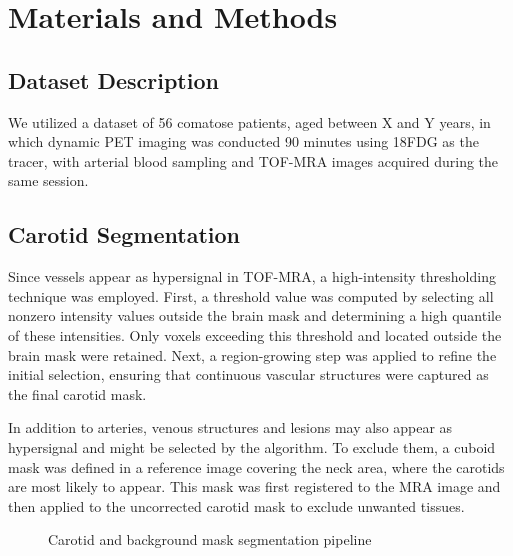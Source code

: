 \chapter{Materials and Methods}

\section{Dataset Description}
We utilized a dataset of 56 comatose patients, aged between  X and Y years, in which dynamic PET imaging was conducted 90 minutes using 18FDG as the tracer, with arterial blood sampling and TOF-MRA images acquired during the same session.
\section{Carotid Segmentation\label{sec:carotid}}
Since vessels appear as hypersignal in TOF-MRA, a high-intensity thresholding technique was employed.
First, a threshold value was computed by selecting all nonzero intensity values outside the brain mask and determining a high quantile of these intensities.
Only voxels exceeding this threshold and located outside the brain mask were retained.
Next, a region-growing step was applied to refine the initial selection, ensuring that continuous vascular structures were captured as the final carotid mask.

In addition to arteries, venous structures and lesions may also appear as hypersignal and might be selected by the algorithm.
To exclude them, a cuboid mask was defined in a reference image covering the neck area, where the carotids are most likely to appear.
This mask was first registered to the MRA image and then applied to the uncorrected carotid mask to exclude unwanted tissues.


\begin{figure}
	\centering
	\caption{Carotid and background mask segmentation pipeline}
\end{figure}

